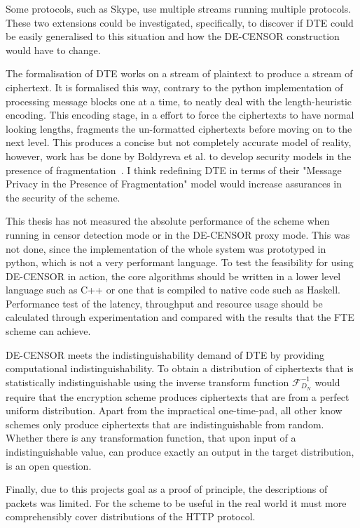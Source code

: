 \documentclass[ %
                    author={Samuel Russell},
                supervisor={Prof. Bogdan Warinschi},
                    degree={MEng},
                     title={Innocuous Ciphertexts},
                  subtitle={The DE-CENSOR Scheme},
                      type={Research},
                      year={2018} ]{dissertation}
\begin{document}
Some protocols, such as Skype, use multiple streams running multiple protocols. These two extensions could be investigated, specifically, to discover if DTE could be easily generalised to this situation and how the DE-CENSOR construction would have to change. 

The formalisation of DTE works on a stream of plaintext to produce a stream of ciphertext.
It is formalised this way, contrary to the python implementation of processing message blocks one at a time, to neatly deal with the length-heuristic encoding.
This encoding stage, in a effort to force the ciphertexts to have normal looking lengths, fragments the un-formatted ciphertexts before moving on to the next level.
This produces a concise but not completely accurate model of reality, however, work has be done by Boldyreva et al. to develop security models in the presence of fragmentation~\cite{frag}.
I think redefining DTE in terms of their "Message Privacy in the Presence of Fragmentation" model would increase assurances in the security of the scheme.

This thesis has not measured the absolute performance of the scheme when running in censor detection mode or in the DE-CENSOR proxy mode. This was not done, since the implementation of the whole system was prototyped in python, which is not a very performant language. To test the feasibility for using DE-CENSOR in action, the core algorithms should be written in a lower level language such as C++ or one that is compiled to native code such as Haskell. Performance test of the latency, throughput and resource usage should be calculated through experimentation and compared with the results that the FTE scheme can achieve.

DE-CENSOR meets the indistinguishability demand of DTE by providing computational indistinguishability. To obtain a distribution of ciphertexts that is statistically indistinguishable using the inverse transform function $\mathcal{F}^{-1}_{D_N}$ would require that the encryption scheme produces ciphertexts that are from a perfect uniform distribution. Apart from the impractical one-time-pad, all other know schemes only produce ciphertexts that are indistinguishable from random. Whether there is any transformation function, that upon input of a indistinguishable value, can produce exactly an output in the target distribution, is an open question.

Finally, due to this projects goal as a proof of principle, the descriptions of packets was limited. For the scheme to be useful in the real world it must more comprehensibly cover distributions of the HTTP protocol.
\end{document}
